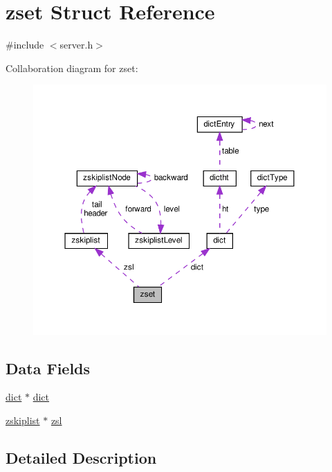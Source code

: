 \hypertarget{structzset}{}\section{zset Struct Reference}
\label{structzset}


{\ttfamily \#include $<$server.\+h$>$}



Collaboration diagram for zset\+:
\nopagebreak
\begin{figure}[H]
\begin{center}
\leavevmode
\includegraphics[width=350pt]{structzset__coll__graph}
\end{center}
\end{figure}
\subsection*{Data Fields}
\begin{DoxyCompactItemize}
\item 
\hyperlink{structdict}{dict} $\ast$ \hyperlink{structzset_aad961c2f260766ff3627bf363fef3551}{dict}
\item 
\hyperlink{structzskiplist}{zskiplist} $\ast$ \hyperlink{structzset_a38454c6ad0755efc07170e913ec10b5a}{zsl}
\end{DoxyCompactItemize}


\subsection{Detailed Description}


